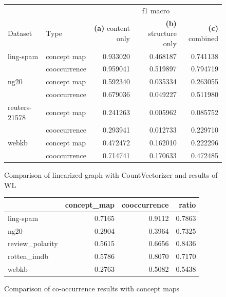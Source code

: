 \begin{figure}[htb!]
\centering
\begin{tabular}{llrrr}
          & & \multicolumn{3}{c}{f1 macro} \\
Dataset & Type & \textbf{(a)} content only & \textbf{(b)} structure only & \textbf{(c)} combined\\
\midrule
ling-spam & concept map &  0.933020 &  0.468187 &  0.741138 \\
          & cooccurrence &  0.959041 &  0.519897 &  0.794719 \\
\midrule
ng20 & concept map &  0.592340 &  0.035334 &  0.263055 \\
          & cooccurrence &  0.679036 &  0.049227 &  0.511980 \\
\midrule
reuters-21578 & concept map &  0.241263 &  0.005962 &  0.085752 \\
          & cooccurrence &  0.293941 &  0.012733 &  0.229710 \\
\midrule
webkb & concept map &  0.472472 &  0.162010 &  0.222296 \\
          & cooccurrence &  0.714741 &  0.170633 &  0.472485 \\
\bottomrule
\end{tabular}
\caption{Comparison of linearized graph with CountVectorizer and results of WL}\label{fig:table-results-structure-vs-content}
\end{figure}



\begin{figure}[htb!]
\centering
\begin{tabular}{lrrr}
&  concept\_map &  cooccurrence &   ratio \\
\midrule
ling-spam       &  0.7165 &  0.9112 &  0.7863 \\
ng20            &  0.2904 &  0.3964 &  0.7325 \\
review\_polarity &  0.5615 &  0.6656 &  0.8436 \\
rotten\_imdb     &  0.5786 &  0.8070 &  0.7170 \\
webkb           &  0.2763 &  0.5082 &  0.5438 \\
\bottomrule
\end{tabular}
\caption{Comparison of co-occurrence results with concept maps}
\end{figure}

